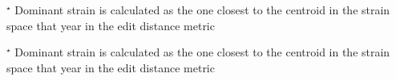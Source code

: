 
\begin{table}\centering
{}\label{tabrec10}

\sffamily\fontsize{7}{8}\selectfont


\flushleft

\fontsize{7}{7}\selectfont
$^\star$ Dominant strain is calculated as the one closest to the centroid in the strain space that year in the edit distance metric
\end{table}


\begin{table}\centering
{}\label{tabrec11}

\sffamily\fontsize{7}{8}\selectfont


\flushleft

\fontsize{7}{7}\selectfont
$^\star$ Dominant strain is calculated as the one closest to the centroid in the strain space that year in the edit distance metric
\end{table}





